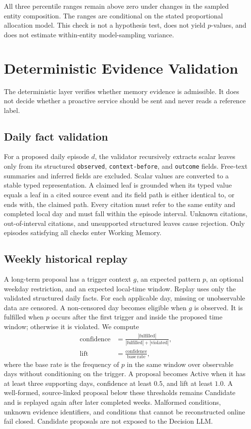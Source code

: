 \documentclass[sigconf,anonymous,review]{acmart}
\begin{document}
All three percentile ranges remain above zero under changes in the sampled
entity composition.  The ranges are conditional on the stated proportional
allocation model.  This check is not a hypothesis test, does not yield
$p$-values, and does not estimate within-entity model-sampling variance.

\section{Deterministic Evidence Validation}

The deterministic layer verifies whether memory evidence is admissible.  It
does not decide whether a proactive service should be sent and never reads a
reference label.

\subsection{Daily fact validation}

For a proposed daily episode $d$, the validator recursively extracts scalar
leaves only from its structured \texttt{observed},
\texttt{context-before}, and \texttt{outcome} fields.  Free-text summaries and
inferred fields are excluded.  Scalar values are converted to a stable typed
representation.  A claimed leaf is grounded when its typed value equals a leaf
in a cited source event and its field path is either identical to, or ends with,
the claimed path.  Every citation must refer to the same entity and completed
local day and must fall within the episode interval.  Unknown citations,
out-of-interval citations, and unsupported structured leaves cause rejection.
Only episodes satisfying all checks enter Working Memory.

\subsection{Weekly historical replay}

A long-term proposal has a trigger context $g$, an expected pattern $p$, an
optional weekday restriction, and an expected local-time window.  Replay uses
only the validated structured daily facts.  For each applicable day, missing or
unobservable data are censored.  A non-censored day becomes eligible when $g$
is observed.  It is fulfilled when $p$ occurs after the first trigger and inside
the proposed time window; otherwise it is violated.  We compute
\begin{align}
\mathrm{confidence} &=
\frac{|\mathrm{fulfilled}|}{|\mathrm{fulfilled}|+|\mathrm{violated}|},\\
\mathrm{lift} &=
\frac{\mathrm{confidence}}{\mathrm{base\ rate}},
\end{align}
where the base rate is the frequency of $p$ in the same window over observable
days without conditioning on the trigger.  A proposal becomes Active when it
has at least three supporting days, confidence at least $0.5$, and lift at least
$1.0$.  A well-formed, source-linked proposal below these thresholds remains
Candidate and is replayed again after later completed weeks.  Malformed
conditions, unknown evidence identifiers, and conditions that cannot be
reconstructed online fail closed.  Candidate proposals are not exposed to the
Decision LLM.
\end{document}
